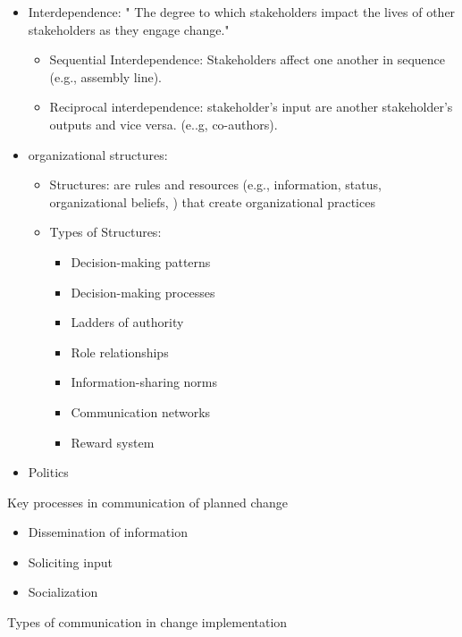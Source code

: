 \documentclass[
]{book}
\providecommand{\tightlist}{%
  \setlength{\itemsep}{0pt}\setlength{\parskip}{0pt}}
\begin{document}
\begin{itemize}
\item
  Interdependence: " The degree to which stakeholders impact the lives of other stakeholders as they engage change."
  \citep{Lewis_2019}

  \begin{itemize}
  \tightlist
  \item
    Sequential Interdependence: Stakeholders affect one another in sequence (e.g., assembly line).
  \item
    Reciprocal interdependence: stakeholder's input are another stakeholder's outputs and vice versa. (e..g,
    co-authors).
  \end{itemize}
\item
  organizational structures:

  \begin{itemize}
  \item
    Structures: are rules and resources (e.g., information, status, organizational beliefs, ) that create
    organizational practices
  \item
    Types of Structures:

    \begin{itemize}
    \tightlist
    \item
      Decision-making patterns
    \item
      Decision-making processes
    \item
      Ladders of authority
    \item
      Role relationships
    \item
      Information-sharing norms
    \item
      Communication networks
    \item
      Reward system
    \end{itemize}
  \end{itemize}
\item
  Politics
\end{itemize}

Key processes in communication of planned change

\begin{itemize}
\tightlist
\item
  Dissemination of information
\item
  Soliciting input
\item
  Socialization
\end{itemize}

Types of communication in change implementation
\end{document}
